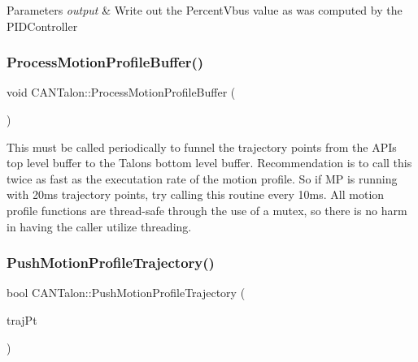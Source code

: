 \begin{DoxyParams}{Parameters}
{\em output} & Write out the Percent\+Vbus value as was computed by the P\+I\+D\+Controller \\
\hline
\end{DoxyParams}
\mbox{\label{class_c_a_n_talon_acae568b6fd2f765dfd0c40d2533a3274}} 
\subsubsection{\texorpdfstring{Process\+Motion\+Profile\+Buffer()}{ProcessMotionProfileBuffer()}}
{\footnotesize\ttfamily void C\+A\+N\+Talon\+::\+Process\+Motion\+Profile\+Buffer (\begin{DoxyParamCaption}{ }\end{DoxyParamCaption})}

This must be called periodically to funnel the trajectory points from the A\+PI\textquotesingle{}s top level buffer to the Talon\textquotesingle{}s bottom level buffer. Recommendation is to call this twice as fast as the executation rate of the motion profile. So if MP is running with 20ms trajectory points, try calling this routine every 10ms. All motion profile functions are thread-\/safe through the use of a mutex, so there is no harm in having the caller utilize threading. \mbox{\label{class_c_a_n_talon_ad1a6d30f15c781574dd9e621938003c1}} 
\subsubsection{\texorpdfstring{Push\+Motion\+Profile\+Trajectory()}{PushMotionProfileTrajectory()}}
{\footnotesize\ttfamily bool C\+A\+N\+Talon\+::\+Push\+Motion\+Profile\+Trajectory (\begin{DoxyParamCaption}\item[{const \hyperlink{struct_c_a_n_talon_1_1_trajectory_point}{Trajectory\+Point} \&}]{traj\+Pt }\end{DoxyParamCaption})}

